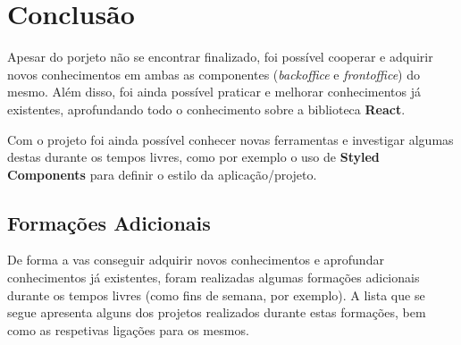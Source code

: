 \chapter{Conclusão}

Apesar do porjeto não se encontrar finalizado, foi possível cooperar e adquirir novos conhecimentos em ambas as componentes (\textit{backoffice} e \textit{frontoffice}) do mesmo. Além disso, foi ainda possível praticar e melhorar conhecimentos já existentes, aprofundando todo o conhecimento sobre a biblioteca \textbf{React}.

Com o projeto foi ainda possível conhecer novas ferramentas e investigar algumas destas durante os tempos livres, como por exemplo o uso de \textbf{Styled Components} para definir o estilo da aplicação/projeto.

\section{Formações Adicionais}

De forma a vas conseguir adquirir novos conhecimentos e aprofundar conhecimentos já existentes, foram realizadas algumas formações adicionais durante os tempos livres (como fins de semana, por exemplo). A lista que se segue apresenta alguns dos projetos realizados durante estas formações, bem como as respetivas ligações para os mesmos.


